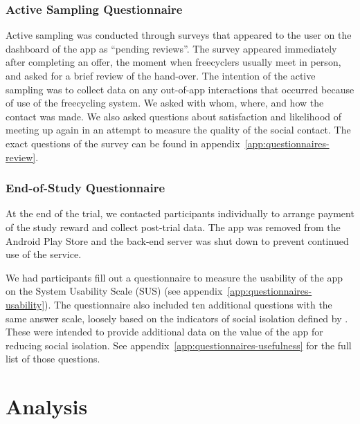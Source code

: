 \subsubsection*{Active Sampling Questionnaire}
\label{sec:active_sampling}

Active sampling was conducted through surveys that appeared to the user on the dashboard of the app as ``pending reviews''. The survey appeared immediately after completing an offer, the moment when freecyclers usually meet in person, and asked for a brief review of the hand-over. The intention of the active sampling was to collect data on any out-of-app interactions that occurred because of use of the freecycling system. We asked with whom, where, and how the contact was made. We also asked questions about satisfaction and likelihood of meeting up again in an attempt to measure the quality of the social contact. The exact questions of the survey can be found in appendix~\ref{app:questionnaires-review}.


\subsubsection*{End-of-Study Questionnaire}

At the end of the trial, we contacted participants individually to arrange payment of the study reward and collect post-trial data. The app was removed from the Android Play Store and the back-end server was shut down to prevent continued use of the service.

We had participants fill out a questionnaire to measure the usability of the app on the System Usability Scale (SUS) (see appendix~\ref{app:questionnaires-usability}). The questionnaire also included ten additional questions with the same answer scale, loosely based on the indicators of social isolation defined by . These were intended to provide additional data on the value of the app for reducing social isolation. See appendix~\ref{app:questionnaires-usefulness} for the full list of those questions.


\section{Analysis}

